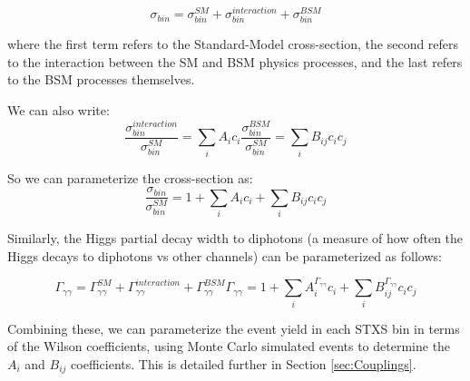 \begin{equation}
\sigma_{bin} =  \sigma_{bin}^{SM} + \sigma_{bin}^{interaction} + \sigma_{bin}^{BSM}
\end{equation}

where the first term refers to the Standard-Model cross-section, the second refers to the interaction between the SM and BSM physics processes, and the last refers to the BSM processes themselves.

We can also write:
\begin{equation}
\frac{\sigma_{bin}^{interaction}}{\sigma_{bin}^{SM}} = \sum_{i} A_{i} c_{i}
\frac{\sigma_{bin}^{BSM}}{\sigma_{bin}^{SM}} = \sum_{i} B_{ij} c_{i} c_{j}
\end{equation}

So we can parameterize the cross-section as:
\begin{equation}
\frac{\sigma_{bin}}{\sigma_{bin}^{SM}} = 1 + \sum_{i} A_{i} c_{i} + \sum_{i} B_{ij} c_{i} c_{j}
\end{equation}

Similarly, the Higgs partial decay width to diphotons (a measure of how often the Higgs decays to diphotons vs other channels) can be parameterized as follows:

\begin{equation}
\Gamma_{\gamma \gamma} = \Gamma_{\gamma \gamma}^{SM} + \Gamma_{\gamma \gamma}^{interaction} + \Gamma_{\gamma \gamma}^{BSM}
\Gamma_{\gamma \gamma} = 1 + \sum_{i} A_{i}^{\Gamma_{\gamma \gamma}} c_{i} + \sum_{i} B_{ij}^{\Gamma_{\gamma \gamma}} c_{i} c_{j}
\end{equation}

Combining these, we can parameterize the event yield in each STXS bin in terms of the Wilson coefficients, using Monte Carlo simulated events to determine the $A_{i}$ and $B_{ij}$ coefficients. This is detailed further in Section \ref{sec:Couplings}.